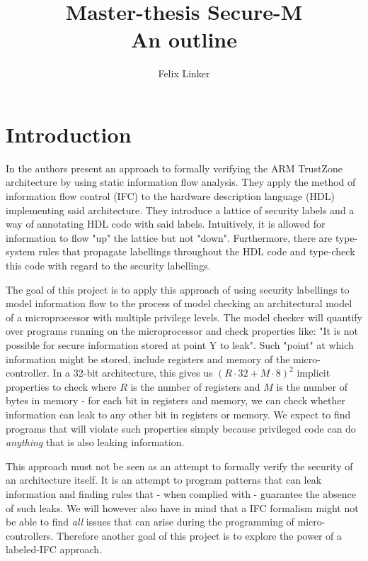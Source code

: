\documentclass{securem}
\title{Master-thesis Secure-M \\ \large{An outline}}
\author{Felix Linker}
\date{}
\begin{document}
\maketitle

\section{Introduction}

In \cite{Ferraiuolo17} the authors present an approach to formally verifying the ARM TrustZone architecture by using static information flow analysis.
They apply the method of information flow control (IFC) to the hardware description language (HDL) implementing said architecture.
They introduce a lattice of security labels and a way of annotating HDL code with said labels.
Intuitively, it is allowed for information to flow "up" the lattice but not "down".
Furthermore, there are type-system rules that propagate labellings throughout the HDL code and type-check this code with regard to the security labellings.

The goal of this project is to apply this approach of using security labellings to model information flow to the process of model checking an architectural model of a microprocessor with multiple privilege levels.
The model checker will quantify over programs running on the microprocessor and check properties like: "It is not possible for secure information stored at point Y to leak".
Such "point" at which information might be stored, include registers and memory of the micro-controller.
In a 32-bit architecture, this gives us $ (R \cdot 32 + M \cdot 8)^2 $ implicit properties to check where $ R $ is the number of registers and $ M $ is the number of bytes in memory - for each bit in registers and memory, we can check whether information can leak to any other bit in registers or memory.
We expect to find programs that will violate such properties simply because privileged code can do \textit{anything} that is also leaking information.

This approach must not be seen as an attempt to formally verify the security of an architecture itself.
It is an attempt to program patterns that can leak information and finding rules that - when complied with - guarantee the absence of such leaks.
We will however also have in mind that a IFC formalism might not be able to find \textit{all} issues that can arise during the programming of micro-controllers.
Therefore another goal of this project is to explore the power of a labeled-IFC approach.
\end{document}
